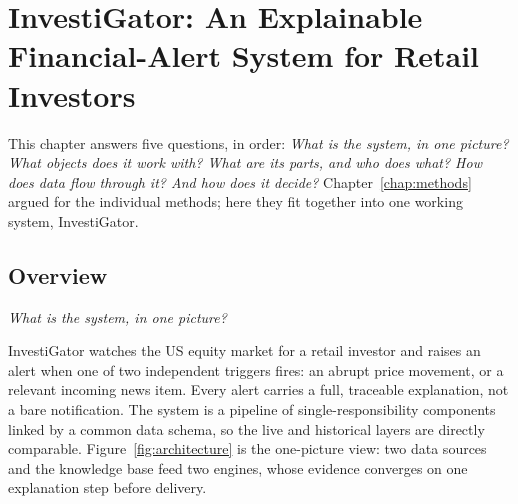 
\chapter{InvestiGator: An Explainable Financial-Alert System for Retail Investors}
\label{chap:investigator}

This chapter answers five questions, in order: \emph{What is the system, in one picture? What objects does
it work with? What are its parts, and who does what? How does data flow through it? And how does it decide?}
Chapter~\ref{chap:methods} argued for the individual methods; here they fit together into one working
system, InvestiGator.

\section{Overview}
\label{sec:investigator_overview}

\emph{What is the system, in one picture?}

InvestiGator watches the US equity market for a retail investor and raises an alert when one of two
independent triggers fires: an abrupt price movement, or a relevant incoming news item. Every alert carries
a full, traceable explanation, not a bare notification. The system is a pipeline of single-responsibility
components linked by a common data schema, so the live and historical layers are directly comparable.
Figure~\ref{fig:architecture} is the one-picture view: two data sources and the knowledge base feed two
engines, whose evidence converges on one explanation step before delivery.

